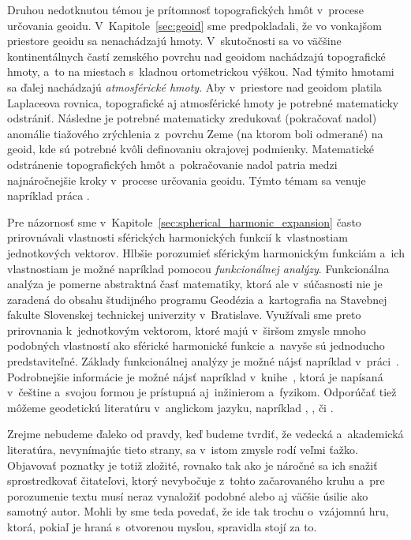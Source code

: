 \documentclass[a4paper, 12pt]{book}
\begin{document}
Druhou nedotknutou témou je prítomnosť topografických hmôt v~procese určovania 
geoidu.  V~Kapitole~\ref{sec:geoid} sme predpokladali, že vo vonkajšom 
priestore geoidu sa nenachádzajú hmoty.  V~skutočnosti sa vo väčšine 
kontinentálnych častí zemského povrchu nad geoidom nachádzajú topografické 
hmoty, a~to na miestach s~kladnou ortometrickou výškou.  Nad týmito hmotami sa 
ďalej nachádzajú \emph{atmosférické hmoty}.  Aby v~priestore nad geoidom 
platila Laplaceova rovnica, topografické aj atmosférické hmoty je potrebné 
matematicky odstrániť.  Následne je potrebné matematicky zredukovať (pokračovať 
nadol) anomálie tiažového zrýchlenia z~povrchu Zeme (na ktorom boli odmerané) 
na geoid, kde sú potrebné kvôli definovaniu okrajovej podmienky.  Matematické 
odstránenie topografických hmôt a~pokračovanie nadol patria medzi 
najnáročnejšie kroky v~procese určovania geoidu.  Týmto témam sa venuje 
napríklad práca \textcite{Janak2006}.

Pre názornosť sme v~Kapitole~\ref{sec:spherical_harmonic_expansion} často 
prirovnávali vlastnosti sférických harmonických funkcií k~vlastnostiam 
jednotkových vektorov.  Hlbšie porozumieť sférickým harmonickým funkciám a~ich 
vlastnostiam je možné napríklad pomocou \emph{funkcionálnej analýzy}.  
Funkcionálna analýza je pomerne abstraktná časť matematiky, ktorá ale 
v~súčasnosti nie je zaradená do obsahu študijného programu Geodézia 
a~kartografia na Stavebnej fakulte Slovenskej technickej univerzity 
v~Bratislave.  Využívali sme preto prirovnania k~jednotkovým vektorom, ktoré 
majú v~širšom zmysle mnoho podobných vlastností ako sférické harmonické funkcie 
a~navyše sú jednoducho predstaviteľné.  Základy funkcionálnej analýzy je možné 
nájsť napríklad v~práci~\textcite{Janak2006}.  Podrobnejšie informácie je možné 
nájsť napríklad v~knihe~\textcite{Rektorys}, ktorá je napísaná v~češtine 
a~svojou formou je prístupná aj~inžinierom a~fyzikom.  Odporúčať tiež môžeme 
geodetickú literatúru v~anglickom jazyku, napríklad 
\textcite{MoritzAdvancedGeodesy}, \textcite{SansoGeoidDetermination}, 
\textcite{Borre2006} či \textcite{Freeden2009}.

Zrejme nebudeme ďaleko od pravdy, keď budeme tvrdiť, že vedecká a~akademická 
literatúra, nevynímajúc tieto strany, sa v~istom zmysle rodí veľmi ťažko.  
Objavovať poznatky je totiž zložité, rovnako tak ako je náročné sa ich snažiť 
sprostredkovať čitateľovi, ktorý nevybočuje z~tohto začarovaného kruhu a~pre 
porozumenie textu musí neraz vynaložiť podobné alebo aj väčšie úsilie ako 
samotný autor.  Mohli by sme teda povedať, že ide tak trochu o~vzájomnú hru, 
ktorá, pokiaľ je hraná s~otvorenou mysľou, spravidla stojí za to.
\end{document}
